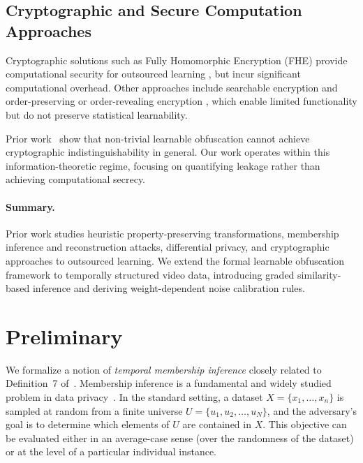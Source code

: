 \documentclass[sigconf,anonymous, review]{acmart}
\begin{document}
\subsection{Cryptographic and Secure Computation Approaches}

Cryptographic solutions such as Fully Homomorphic Encryption (FHE) provide computational security for outsourced learning \cite{gentry2009fhe,gorantala2023fhe}, but incur significant computational overhead. Other approaches include searchable encryption \cite{kamara2013parallel,stefanov2013dynamic} and order-preserving or order-revealing encryption \cite{agrawal2004order,popa2013ideal,lewi2016order}, which enable limited functionality but do not preserve statistical learnability.

Prior work~\cite{xiao2024formal} show that non-trivial learnable obfuscation cannot achieve cryptographic indistinguishability in general. Our work operates within this information-theoretic regime, focusing on quantifying leakage rather than achieving computational secrecy.

\paragraph{Summary.}
Prior work studies heuristic property-preserving transformations, membership inference and reconstruction attacks, differential privacy, and cryptographic approaches to outsourced learning. We extend the formal learnable obfuscation framework to temporally structured video data, introducing graded similarity-based inference and deriving weight-dependent noise calibration rules.

\section{Preliminary}
\label{sec:preliminary}
We formalize a notion of \emph{temporal membership inference} closely related to Definition~7 of~\cite{xiao2024formal}. Membership inference is a fundamental and widely studied problem in data privacy~\cite{backes2016membership,shokri2017membership}. In the standard setting, a dataset \( X = \{x_1, \dots, x_n\} \) is sampled at random from a finite universe \( U = \{u_1, u_2, \dots, u_N\} \), and the adversary's goal is to determine which elements of \( U \) are contained in \( X \). This objective can be evaluated either in an average-case sense (over the randomness of the dataset) or at the level of a particular individual instance.
\end{document}
